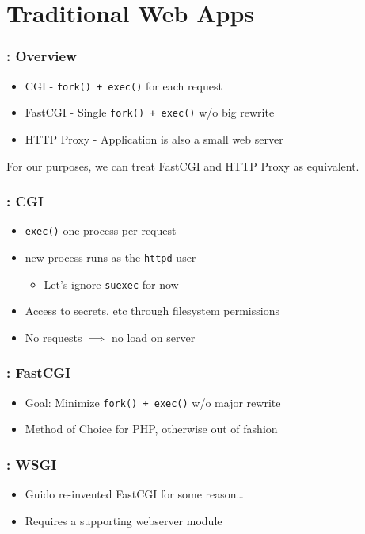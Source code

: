 \documentclass{beamer}
\begin{document}
\section{Traditional Web Apps}
\frame{\sectionpage}

\begin{frame}
	\frametitle{\insertsection : Overview}
	\begin{itemize}
		\pause \item CGI - \texttt{fork() + exec()} for each request
		\pause \item FastCGI - Single \texttt{fork() + exec()} w/o big rewrite
		\pause \item HTTP Proxy - Application is also a small web server
	\end{itemize}
	\pause For our purposes, we can treat FastCGI and HTTP Proxy as equivalent.
\end{frame}

\begin{frame}
	\frametitle{\insertsection : CGI}
	\begin{itemize}
		\pause \item \texttt{exec()} one process per request
		\pause \item new process runs as the \texttt{httpd} user
			\begin{itemize}
				\item Let's ignore \texttt{suexec} for now
			\end{itemize}
		\pause \item Access to secrets, etc through filesystem permissions
		\pause \item No requests $\implies$ no load on server
	\end{itemize}
\end{frame}

\begin{frame}
	\frametitle{\insertsection : FastCGI}
	\begin{itemize}
		\pause \item Goal: Minimize \texttt{fork() + exec()} w/o major rewrite
		\pause \item Method of Choice for PHP, otherwise out of fashion
	\end{itemize}
\end{frame}

\begin{frame}
	\frametitle{\insertsection : WSGI}
	\begin{itemize}
		\pause \item Guido re-invented FastCGI for some reason\ldots
		\pause \item Requires a supporting webserver module
	\end{itemize}
\end{frame}
\end{document}
